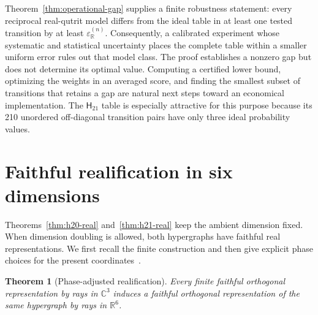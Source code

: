 \documentclass[twocolumn,aps,pra,floatfix,amsmath,amssymb,longbibliography]{revtex4-2}
\newtheorem{theorem}{Theorem}
\theoremstyle{definition}
\theoremstyle{remark}
\newcommand{\C}{\mathbb C}
\newcommand{\R}{\mathbb R}
\newcommand{\Htwentyone}{\mathsf H_{21}}
\begin{document}
Theorem~\ref{thm:operational-gap} supplies a finite robustness statement:
every reciprocal real-qutrit model differs from the ideal table in at least
one tested transition by at least $\varepsilon_{\R}^{(n)}$.  Consequently, a
calibrated experiment whose systematic and statistical uncertainty places
the complete table within a smaller uniform error rules out that model class.
The proof establishes a nonzero gap but does not determine its optimal value.
Computing a certified lower bound, optimizing the weights in an averaged
score, and finding the smallest subset of transitions that retains a gap are
natural next steps toward an economical implementation.  The
$\Htwentyone$ table is especially attractive for this purpose because its
210 unordered off-diagonal transition pairs have only three ideal probability
values.

\section{Faithful realification in six dimensions}
\label{sec:realification}

Theorems~\ref{thm:h20-real} and~\ref{thm:h21-real} keep the ambient
dimension fixed.  When dimension doubling is allowed, both hypergraphs have
faithful real representations.  We first recall the finite construction and
then give explicit phase choices for the present
coordinates~\cite{svozil-2025-rvc}.

\begin{theorem}[Phase-adjusted realification]
\label{thm:realification}
Every finite faithful orthogonal representation by rays in $\C^3$ induces a
faithful orthogonal representation of the same hypergraph by rays in $\R^6$.
\end{theorem}
\end{document}
